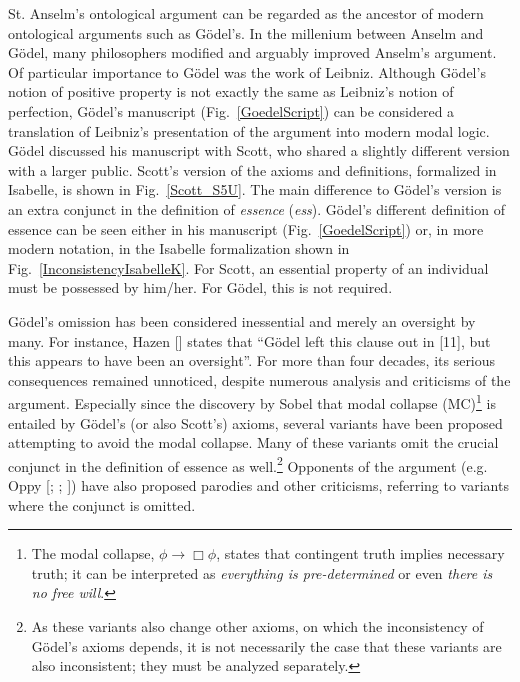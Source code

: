 \documentclass{article}
\begin{document}
St. Anselm's ontological argument \cite{Proslogion} can be regarded as
the ancestor of modern ontological arguments such as G\"odel's. In the
millenium between Anselm and G\"odel, many philosophers modified and
arguably improved Anselm's argument. Of particular importance to
G\"odel was the work of Leibniz. 
Although G\"odel's notion of positive property is not exactly the same as Leibniz's notion of perfection, G\"odel's manuscript
(Fig.~\ref{GoedelScript}) can be considered a translation of Leibniz's
presentation of the argument into modern modal logic. G\"odel
discussed his manuscript with Scott, who shared a slightly different
version with a larger public. Scott's version of the axioms and
definitions, formalized in Isabelle, is shown in
Fig.~\ref{Scott_S5U}. The main difference to G\"odel's version is an
extra conjunct in the definition of \emph{essence} (\emph{ess}). G\"odel's
different definition of essence can be seen either in his manuscript
(Fig.~\ref{GoedelScript}) or, in more modern notation, in the Isabelle
formalization shown in Fig.~\ref{InconsistencyIsabelleK}. For Scott,
an essential property of an individual must be possessed by
him/her. For G\"odel, this is not required. 

G\"odel's omission has been
considered inessential and merely an oversight by many. For instance,
Hazen [\citeyear[p.365]{Hazen}] states that ``G\"odel left this
clause out in [11], but this appears to have been an oversight''.
For more than four decades, its serious consequences remained unnoticed, 
despite numerous analysis and criticisms of the
argument. Especially since the discovery by Sobel
 that modal collapse (MC)\footnote{The modal collapse,
  $\phi\rightarrow \Box \phi$, states that contingent truth implies
  necessary truth; it can be interpreted as \textit{everything is
    pre-determined} or even \textit{there is no free will}. } is
entailed by G\"odel's (or also Scott's) axioms, several variants have
been proposed
\cite{Anderson,AndersonGettings,Hajek1,Hajek2,Hajek3,Bjordal}
attempting to avoid the modal collapse. Many of these variants omit
the crucial conjunct in the definition of essence as well.\footnote{As
  these variants also change other axioms, on which the inconsistency
  of G\"odel's axioms depends, it is not necessarily the case that
  these variants are also inconsistent; they must be analyzed
  separately.} Opponents of the argument
(e.g. Oppy [\citeyear[p.226--227]{oppy96:_goedel_ontol_argum};
\citeyear[p.364]{oppy00:_respon_gettin};
\citeyear[p.1068]{oppy08:_higher_order_ontol_argum}]) have also proposed
parodies and other criticisms, referring to variants where the
conjunct is omitted.
\end{document}
